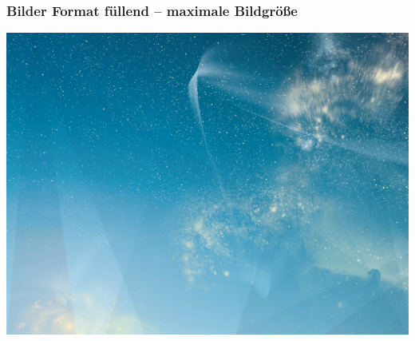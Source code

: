 \begin{frame}
    \frametitle{Bilder Format füllend -- maximale Bildgröße}

\begin{minipage}[t][0cm]{\paperwidth}%
\hspace*{-\PraesentationSeitenrand}%
\includegraphics[width=\textwidth]{./Ressourcen/_Bilder/SternenhimmelQuer.jpg}
\end{minipage}
    
\end{frame}
\clearpage



